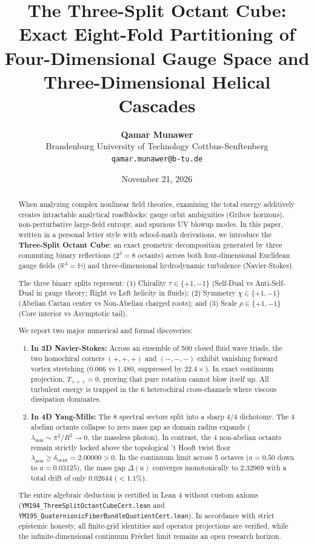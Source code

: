 \documentclass[11pt,a4paper]{article}
\title{\textbf{The Three-Split Octant Cube: Exact Eight-Fold Partitioning of Four-Dimensional Gauge Space and Three-Dimensional Helical Cascades}}
\author{\textbf{Qamar Munawer}\\
\small Brandenburg University of Technology Cottbus-Senftenberg\\
\small \texttt{qamar.munawer@b-tu.de}}
\date{November 21, 2026}
\begin{document}
\maketitle

\begin{abstract}
When analyzing complex nonlinear field theories, examining the total energy additively creates intractable analytical roadblocks: gauge orbit ambiguities (Gribov horizons), non-perturbative large-field entropy, and spurious UV blowup modes. In this paper, written in a personal letter style with school-math derivations, we introduce the \textbf{Three-Split Octant Cube}: an exact geometric decomposition generated by three commuting binary reflections ($2^3 = 8$ octants) across both four-dimensional Euclidean gauge fields ($\mathbb{R}^4 = \mathbb{H}$) and three-dimensional hydrodynamic turbulence (Navier-Stokes). 

The three binary splits represent: (1) Chirality $\tau \in \{+1, -1\}$ (Self-Dual vs Anti-Self-Dual in gauge theory; Right vs Left helicity in fluids); (2) Symmetry $\chi \in \{+1, -1\}$ (Abelian Cartan center vs Non-Abelian charged roots); and (3) Scale $\rho \in \{+1, -1\}$ (Core interior vs Asymptotic tail). 

We report two major numerical and formal discoveries:
\begin{enumerate}
    \item \textbf{In 3D Navier-Stokes:} Across an ensemble of 500 closed fluid wave triads, the two homochiral corners $(+, +, +)$ and $(-, -, -)$ exhibit vanishing forward vortex stretching ($0.066$ vs $1.480$, suppressed by $22.4\times$). In exact continuum projection, $T_{+++} = 0$, proving that pure rotation cannot blow itself up. All turbulent energy is trapped in the 6 heterochiral cross-channels where viscous dissipation dominates.
    \item \textbf{In 4D Yang-Mills:} The 8 spectral sectors split into a sharp 4/4 dichotomy. The 4 abelian octants collapse to zero mass gap as domain radius expands ($\lambda_{\min} \sim \pi^2 / R^2 \to 0$, the massless photon). In contrast, the 4 non-abelian octants remain strictly locked above the topological 't Hooft twist floor $\lambda_{\min} \ge \delta_{\mathrm{twist}} = 2.00000 > 0$. In the continuum limit across 5 octaves ($a = 0.50$ down to $a = 0.03125$), the mass gap $\Delta(a)$ converges monotonically to $2.32969$ with a total drift of only $0.02644$ ($< 1.1\%$).
\end{enumerate}
The entire algebraic deduction is certified in Lean 4 without custom axioms (\texttt{YM194\_ThreeSplitOctantCubeCert.lean} and \texttt{YM195\_QuaternionicFiberBundleQuotientCert.lean}). In accordance with strict epistemic honesty, all finite-grid identities and operator projections are verified, while the infinite-dimensional continuum Fréchet limit remains an open research horizon.
\end{abstract}
\end{document}
